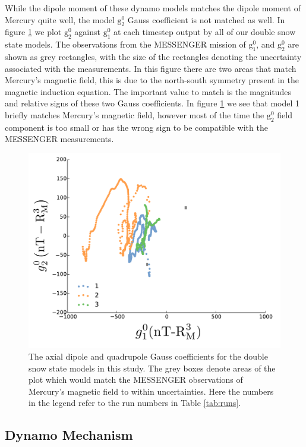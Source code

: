 While the dipole moment of these dynamo models matches the dipole moment of Mercury quite well, the model $\mathrm{g}_2^0$ Gauss coefficient is not matched as well. In figure \ref{fig:gauss} we plot $\mathrm{g}_2^{0}$ against $\mathrm{g}_1^{0}$ at each timestep output by all of our double snow state models. The observations from the MESSENGER mission of $\mathrm{g}_1^{0}$, and $\mathrm{g}_2^{0}$ are shown as grey rectangles, with the size of the rectangles denoting the uncertainty associated with the measurements. In this figure there are two areas that match Mercury's magnetic field, this is due to the north-south symmetry present in the magnetic induction equation. The important value to match is the magnitudes and relative signs of these two Gauss coefficients. In figure \ref{fig:gauss} we see that model 1 briefly matches Mercury's magnetic field, however most of the time the $\mathrm{g}_2^0$ field component is too small or has the wrong sign to be compatible with the MESSENGER measurements. 
\begin{figure}
	\centering
	\noindent\includegraphics[width=30pc]{Chapter4/figures/g10g20.pdf}
	\caption{The axial dipole and quadrupole Gauss coefficients for the double snow state models in this study. The grey boxes denote areas of the plot which would match the MESSENGER observations of Mercury's magnetic field to within uncertainties. Here the numbers in the legend refer to the run numbers in Table \ref{tab:runs}.}
	\label{fig:gauss}
\end{figure}

\subsection{Dynamo Mechanism}
